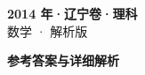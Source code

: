 \documentclass[zihao=-4, a4paper]{ctexart}
\begin{document}
\begin{center}
  {\Large\bfseries 2014 年·辽宁卷·理科}\\[4pt]
  {\large 数学 · 解析版}
\end{center}
\medskip
{}

\clearpage
{}
\begin{center}{\Large\bfseries 参考答案与详细解析}\end{center}
\medskip

\end{document}
